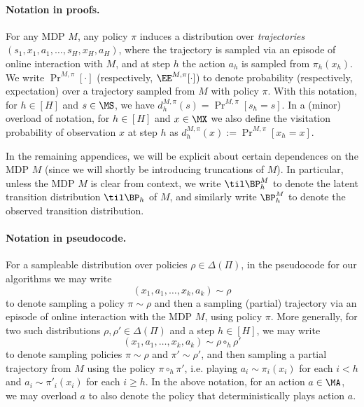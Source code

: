 \paragraph{Notation in proofs.} For any MDP $M$, any policy $\pi$ induces a distribution over \emph{trajectories} $(s_1,x_1,a_1,\dots,s_H,x_H,a_H)$, where the trajectory is sampled via an episode of online interaction with $M$, and at step $h$ the action $a_h$ is sampled from $\pi_h(x_h)$. We write $\Pr^{M,\pi}[\cdot]$ (respectively, $\EE^{M,\pi}[\cdot]$) to denote probability (respectively, expectation) over a trajectory sampled from $M$ with policy $\pi$. With this notation, for $h \in [H]$ and $s \in \MS$, we have $d^{M,\pi}_h(s) = \Pr^{M,\pi}[s_h=s]$. In a (minor) overload of notation, for $h \in [H]$ and $x \in \MX$ we also define the visitation probability of observation $x$ at step $h$ as $d^{M,\pi}_h(x) := \Pr^{M,\pi}[x_h = x]$. %

In the remaining appendices, we will be explicit about certain dependences on the MDP $M$ (since we will shortly be introducing truncations of $M$). In particular, unless the MDP $M$ is clear from context, we write $\til\BP^M_h$ to denote the latent transition distribution $\til \BP_h$ of $M$, and similarly write $\BP^M_h$ to denote the observed transition distribution.

\paragraph{Notation in pseudocode.} For a sampleable distribution over policies $\rho \in \Delta(\Pi)$, in the pseudocode for our algorithms we may write 
\[(x_1,a_1,\dots,x_k,a_k) \sim \rho\]
to denote sampling a policy $\pi \sim \rho$ and then a sampling (partial) trajectory via an episode of online interaction with the MDP $M$, using policy $\pi$. More generally, for two such distributions $\rho,\rho' \in \Delta(\Pi)$ and a step $h \in [H]$, we may write
\[(x_1,a_1,\dots,x_k,a_k) \sim \rho \circ_h \rho'\]
to denote sampling policies $\pi \sim \rho$ and $\pi' \sim \rho'$, and then sampling a partial trajectory from $M$ using the policy $\pi \circ_h \pi'$, i.e. playing $a_i \sim\pi_i(x_i)$ for each $i < h$ and $a_i \sim \pi'_i(x_i)$ for each $i \geq h$. In the above notation, for an action $a \in \MA$, we may overload $a$ to also denote the policy that deterministically plays action $a$.

